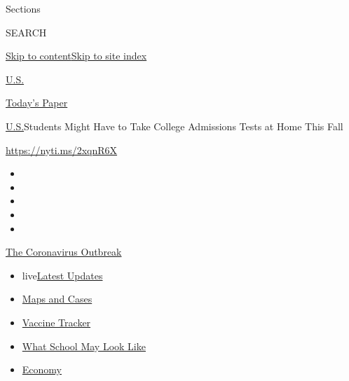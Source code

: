 Sections

SEARCH

\protect\hyperlink{site-content}{Skip to
content}\protect\hyperlink{site-index}{Skip to site index}

\href{https://www.nytimes.com/section/us}{U.S.}

\href{https://myaccount.nytimes.com/auth/login?response_type=cookie\&client_id=vi}{}

\href{https://www.nytimes.com/section/todayspaper}{Today's Paper}

\href{/section/us}{U.S.}\textbar{}Students Might Have to Take College
Admissions Tests at Home This Fall

\url{https://nyti.ms/2xqnR6X}

\begin{itemize}
\item
\item
\item
\item
\item
\end{itemize}

\href{https://www.nytimes.com/news-event/coronavirus?action=click\&pgtype=Article\&state=default\&region=TOP_BANNER\&context=storylines_menu}{The
Coronavirus Outbreak}

\begin{itemize}
\tightlist
\item
  live\href{https://www.nytimes.com/2020/08/02/world/coronavirus-updates.html?action=click\&pgtype=Article\&state=default\&region=TOP_BANNER\&context=storylines_menu}{Latest
  Updates}
\item
  \href{https://www.nytimes.com/interactive/2020/us/coronavirus-us-cases.html?action=click\&pgtype=Article\&state=default\&region=TOP_BANNER\&context=storylines_menu}{Maps
  and Cases}
\item
  \href{https://www.nytimes.com/interactive/2020/science/coronavirus-vaccine-tracker.html?action=click\&pgtype=Article\&state=default\&region=TOP_BANNER\&context=storylines_menu}{Vaccine
  Tracker}
\item
  \href{https://www.nytimes.com/interactive/2020/07/29/us/schools-reopening-coronavirus.html?action=click\&pgtype=Article\&state=default\&region=TOP_BANNER\&context=storylines_menu}{What
  School May Look Like}
\item
  \href{https://www.nytimes.com/live/2020/07/31/business/stock-market-today-coronavirus?action=click\&pgtype=Article\&state=default\&region=TOP_BANNER\&context=storylines_menu}{Economy}
\end{itemize}

